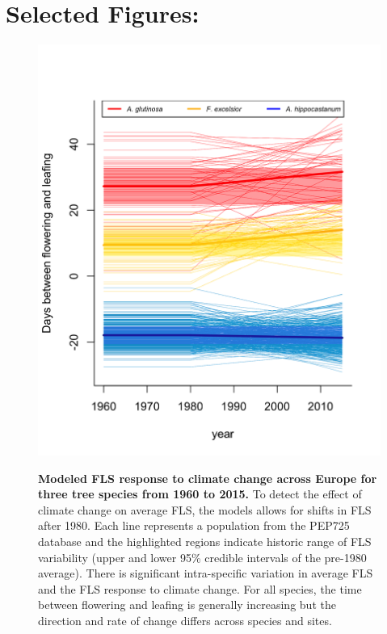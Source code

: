 \documentclass[10.5pt,a4paper]{article}
\begin{document}
\section*{Selected Figures:}
   \begin{figure}[ht!]
   \centering
 \includegraphics[width=.6\textwidth]{..//figure/FLS_climate_change.png}\\
\caption{\textbf{Modeled FLS response to climate change across Europe for three tree species from 1960 to 2015.} To detect the effect of climate change on average FLS, the models allows for shifts in FLS after 1980. Each line represents a population from the PEP725 database and the highlighted regions indicate historic range of FLS variability (upper and lower 95\% credible intervals of the pre-1980 average). There is significant intra-specific variation in average FLS and the FLS response to climate change. For all species, the time between flowering and leafing is generally increasing but the direction and rate of change differs across species and sites.}
    \label{fig:Figure 1}
    \end{figure}
\newpage

\end{document}
